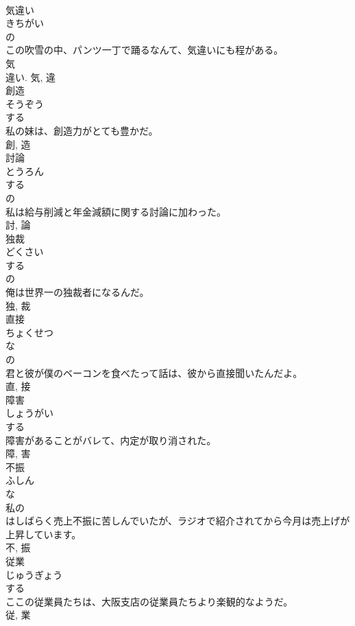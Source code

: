 \documentclass[8pt]{extreport}
\begin{document}
\begin{CJK}{UTF8}{min}
\\	気違い	
\\	きちがい	
\\	の 
\\	この吹雪の中、パンツ一丁で踊るなんて、気違いにも程がある。	
\\	気 
\\	違い.	気, 違	
\\	創造	
\\	そうぞう	
\\	する 
\\	私の妹は、創造力がとても豊かだ。	
\\	創, 造	
\\	討論	
\\	とうろん	
\\	する 
\\	の 
\\	私は給与削減と年金減額に関する討論に加わった。	
\\	討, 論	
\\	独裁	
\\	どくさい	
\\	する 
\\	の 
\\	俺は世界一の独裁者になるんだ。	
\\	独, 裁	
\\	直接	
\\	ちょくせつ	
\\	な 
\\	の 
\\	君と彼が僕のベーコンを食べたって話は、彼から直接聞いたんだよ。	
\\	直, 接	
\\	障害	
\\	しょうがい	
\\	する 
\\	障害があることがバレて、内定が取り消された。	
\\	障, 害	
\\	不振	
\\	ふしん	
\\	な 
\\	私の
\\	はしばらく売上不振に苦しんでいたが、ラジオで紹介されてから今月は売上げが上昇しています。	
\\	不, 振	
\\	従業	
\\	じゅうぎょう	
\\	する 
\\	ここの従業員たちは、大阪支店の従業員たちより楽観的なようだ。	
\\	従, 業	

\end{CJK}
\end{document}

